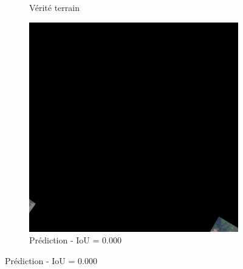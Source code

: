 \begin{figure}[H]
\begin{subfigure}{0.32\textwidth}
    \caption{Vérité terrain}
\end{subfigure}
\hfill
\begin{subfigure}{0.32\textwidth}
    \includegraphics[width=\textwidth]{02-main//figures/ch4/kfold_ensembles/unet_tu-mambaout_small/worst_cases/worst_4_iou0.000_25001112_tile_9_1_991a94_overlay_pred.png}
    \caption{Prédiction - IoU = 0.000}
\end{subfigure}

\vspace{0.35cm}


\end{figure}
